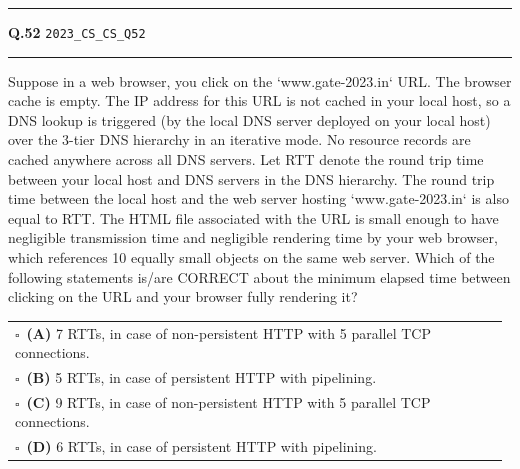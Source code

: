 \documentclass[a4paper,10pt]{article}
\begin{document}
\vspace{6pt}\hrule height 0.35pt\vspace{6pt}
\noindent
\begin{tcolorbox}[
    blanker,
    sidebyside,
    sidebyside align=top,
    lefthand width=0.55\textwidth,
    top=4pt, bottom=4pt, left=0pt, right=0pt,
    middle=16pt,
    underlay={
        \draw[dashed, black!80, line width=0.8pt, dash pattern=on 4pt off 3pt]
            ([xshift=0.55\textwidth+8pt]frame.north west) --
            ([xshift=0.55\textwidth+8pt]frame.south west);
    }
]
\textbf{Q.52}  \hfill {\tiny\texttt{2023\_CS\_CS\_Q52}}
\vspace{2pt}\hrule height 0.3pt\vspace{4pt}

Suppose in a web browser, you click on the `www.gate-2023.in` URL. The browser cache is empty. The IP address for this URL is not cached in your local host, so a DNS lookup is triggered (by the local DNS server deployed on your local host) over the 3-tier DNS hierarchy in an iterative mode. No resource records are cached anywhere across all DNS servers.
Let RTT denote the round trip time between your local host and DNS servers in the DNS hierarchy. The round trip time between the local host and the web server hosting `www.gate-2023.in` is also equal to RTT. The HTML file associated with the URL is small enough to have negligible transmission time and negligible rendering time by your web browser, which references 10 equally small objects on the same web server.
Which of the following statements is/are CORRECT about the minimum elapsed time between clicking on the URL and your browser fully rendering it?

\par\vspace{6pt}\noindent
\begin{tabular}{@{}p{0.98\linewidth}@{}}
$\square$\ \textbf{(A)} 7 RTTs, in case of non-persistent HTTP with 5 parallel TCP connections. \\
\addlinespace[3pt]
$\square$\ \textbf{(B)} 5 RTTs, in case of persistent HTTP with pipelining. \\
\addlinespace[3pt]
$\square$\ \textbf{(C)} 9 RTTs, in case of non-persistent HTTP with 5 parallel TCP connections. \\
\addlinespace[3pt]
$\square$\ \textbf{(D)} 6 RTTs, in case of persistent HTTP with pipelining.
\end{tabular}


\end{tcolorbox}
\end{document}
